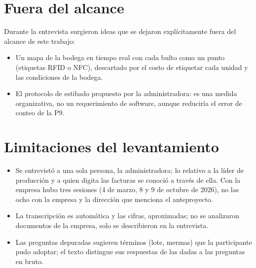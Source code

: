 \section{Fuera del alcance}
\label{sec:req_alcance}

Durante la entrevista surgieron ideas que se dejaron explícitamente fuera del alcance de este trabajo:

\begin{itemize}
    \item Un mapa de la bodega en tiempo real con cada bulto como un punto (etiquetas RFID o NFC), descartado por el costo de etiquetar cada unidad y las condiciones de la bodega.
    \item El protocolo de estibado propuesto por la administradora: es una medida organizativa, no un requerimiento de software, aunque reduciría el error de conteo de la P9.
\end{itemize}

\section{Limitaciones del levantamiento}
\label{sec:req_limitaciones}

\begin{itemize}
    \item Se entrevistó a una sola persona, la administradora; lo relativo a la líder de producción y a quien digita las facturas se conoció a través de ella. Con la empresa hubo tres sesiones (4 de marzo, 8 y 9 de octubre de 2026), no las ocho con la empresa y la dirección que menciona el anteproyecto.
    \item La transcripción es automática y las cifras, aproximadas; no se analizaron documentos de la empresa, solo se describieron en la entrevista.
    \item Las preguntas depuradas sugieren términos (lote, mermas) que la participante pudo adoptar; el texto distingue sus respuestas de las dadas a las preguntas en bruto.
\end{itemize}
